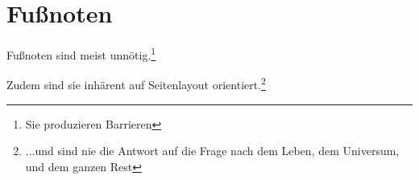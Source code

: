 \documentclass[a4paper]{amsart}
\begin{document}
\section{Fußnoten}

Fußnoten sind meist unnötig.\footnote{Sie produzieren Barrieren}

Zudem sind sie inhärent auf Seitenlayout orientiert.\footnote[42]{...und sind nie die Antwort auf die Frage nach dem Leben, dem Universum, und dem ganzen Rest} 
\end{document}
